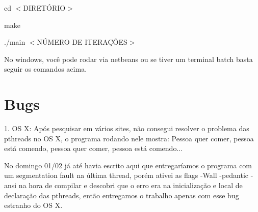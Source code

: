 \documentclass[12pt]{article}
\begin{document}
    cd $<$DIRETÓRIO$>$
    
    make
    
    ./main $<$NÚMERO DE ITERAÇÕES$>$
    
    No windows, você pode rodar via netbeans ou se tiver um terminal batch basta seguir os comandos acima.
    
\section{Bugs}

1. OS X: Após pesquisar em vários sites, não consegui resolver o problema das pthreads no OS X, o programa rodando nele mostra: Pessoa quer comer, pessoa está comendo, pessoa quer comer, pessoa está comendo...

No domingo 01/02 já até havia escrito aqui que entregaríamos o programa com um segmentation fault na última thread, porém ativei as flags -Wall -pedantic -ansi na hora de compilar e descobri que o erro era na inicialização e local de declaração das pthreads, então entregamos o trabalho apenas com esse bug estranho do OS X.
    
\end{document}
